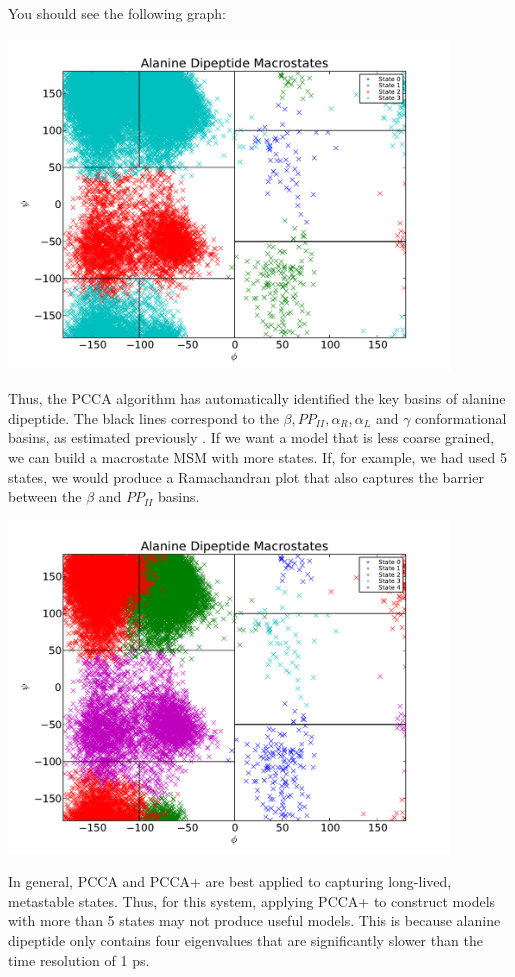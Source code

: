 \documentclass[12pt]{article}
\begin{document}
You should see the following graph:
\begin{center}
\includegraphics[width=11.7cm]{figures/Macro4}
\end{center}


Thus, the PCCA algorithm has automatically identified the key basins of alanine dipeptide.  The black lines correspond to the $\beta, PP_{II}, \alpha_R, \alpha_L$ and $\gamma$ conformational basins, as estimated previously \cite{Jha2005}.  If we want a model that is less coarse grained, we can build a macrostate MSM with more states.  If, for example, we had used 5 states, we would produce a Ramachandran plot that also captures the barrier between the $\beta$ and $PP_{II}$ basins.  

\includegraphics[width=11.7cm]{figures/Macro5}

In general, PCCA and PCCA+ are best applied to capturing long-lived, metastable states.  Thus, for this system, applying PCCA+ to construct models with more than 5 states may not produce useful models.  This is because alanine dipeptide only contains four eigenvalues that are significantly slower than the time resolution of 1 ps.  
\end{document}
